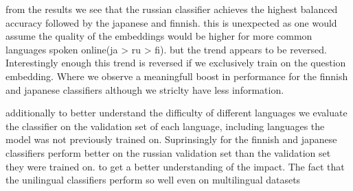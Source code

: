 \documentclass[11pt]{article}
\begin{document}
from the results we see that the russian classifier achieves the highest balanced accuracy followed by the japanese and finnish.
this is unexpected as one would assume the quality of the embeddings would be higher for more common languages spoken online(ja > ru > fi).
but the trend appears to be reversed. Interestingly enough this trend is reversed if we exclusively train on the question embedding. 
Where we observe a meaningfull boost in performance for the finnish and japanese classifiers although we striclty have less information.

additionally to better understand the difficulty of different languages we evaluate the classifier on the validation set of each language, including languages the model was not previously trained on.
Suprinsingly for the finnish and japanese classifiers perform better on the russian validation set than the validation set they were trained on.
to get a better understanding of the impact. The fact that the unilingual classifiers perform so well even on multilingual datasets 

\begin{table}[ht]
    \centering
    \caption{Model performance for language-specific and combined training, with and without context}
    \label{tab:model_performance}
\end{table}
\end{document}
